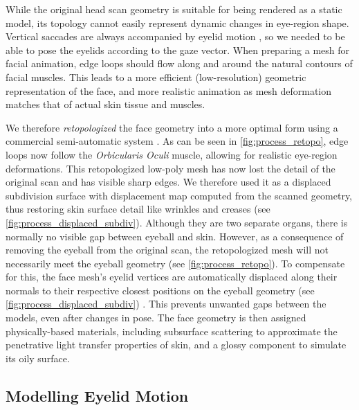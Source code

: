 While the original head scan geometry is suitable for being rendered as a static model, its topology cannot easily represent dynamic changes in eye-region shape.
Vertical saccades are always accompanied by eyelid motion \cite{liversedge2011oxford}, so we needed to be able to pose the eyelids according to the gaze vector.
When preparing a mesh for facial animation, edge loops should flow along and around the natural contours of facial muscles.
This leads to a more efficient (low-resolution) geometric representation of the face, and more realistic animation as mesh deformation matches that of actual skin tissue and muscles.


We therefore \emph{retopologized} the face geometry into a more optimal form using a commercial semi-automatic system \cite{ZRemesher}.
As can be seen in \autoref{fig:process_retopo}, edge loops now follow the \emph{Orbicularis Oculi} muscle, allowing for realistic eye-region deformations.
This retopologized low-poly mesh has now lost the detail of the original scan and has visible sharp edges.
We therefore used it as a displaced subdivision surface \cite{lee2000displaced} with displacement map computed from the scanned geometry, thus restoring skin surface detail like wrinkles and creases (see \autoref{fig:process_displaced_subdiv}).
Although they are two separate organs, there is normally no visible gap between eyeball and skin.
However, as a consequence of removing the eyeball from the original scan, the retopologized mesh will not necessarily meet the eyeball geometry (see \autoref{fig:process_retopo}).
To compensate for this, the face mesh's eyelid vertices are automatically displaced along their normals to their respective closest positions on the eyeball geometry (see \autoref{fig:process_displaced_subdiv}) \cite{Shrinkwrap}.
This prevents unwanted gaps between the models, even after changes in pose.
The face geometry is then assigned physically-based materials, including subsurface scattering to approximate the penetrative light transfer properties of skin, and a glossy component to simulate its oily surface.


\subsection{Modelling Eyelid Motion}

